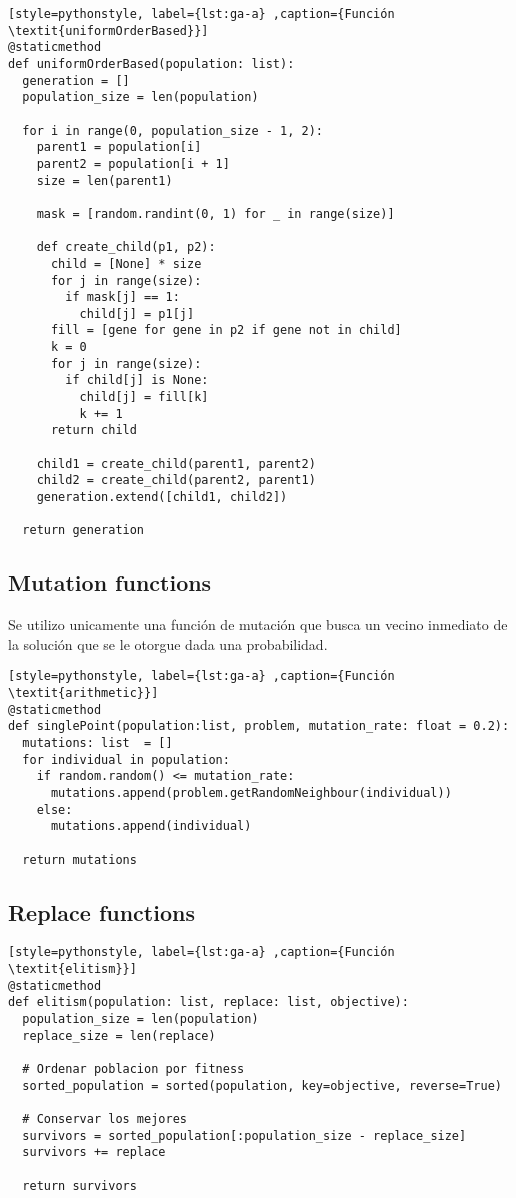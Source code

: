 \begin{lstlisting}[style=pythonstyle, label={lst:ga-a} ,caption={Función  \textit{uniformOrderBased}}]
@staticmethod
def uniformOrderBased(population: list):
  generation = []
  population_size = len(population)

  for i in range(0, population_size - 1, 2):
    parent1 = population[i]
    parent2 = population[i + 1]
    size = len(parent1)

    mask = [random.randint(0, 1) for _ in range(size)]

    def create_child(p1, p2):
	  child = [None] * size
	  for j in range(size):
	    if mask[j] == 1:
		  child[j] = p1[j]
	  fill = [gene for gene in p2 if gene not in child]
	  k = 0
	  for j in range(size):
		if child[j] is None:
		  child[j] = fill[k]
	  	  k += 1
	  return child

	child1 = create_child(parent1, parent2)
	child2 = create_child(parent2, parent1)
	generation.extend([child1, child2])

  return generation
\end{lstlisting}

\subsection{Mutation functions}

Se utilizo unicamente una función de mutación que busca un vecino inmediato de la solución que se le otorgue dada una probabilidad.

\begin{lstlisting}[style=pythonstyle, label={lst:ga-a} ,caption={Función  \textit{arithmetic}}]
@staticmethod
def singlePoint(population:list, problem, mutation_rate: float = 0.2):
  mutations: list  = []
  for individual in population:
    if random.random() <= mutation_rate:
      mutations.append(problem.getRandomNeighbour(individual))
    else:
      mutations.append(individual)

  return mutations
\end{lstlisting}

\subsection{Replace functions}

\begin{lstlisting}[style=pythonstyle, label={lst:ga-a} ,caption={Función  \textit{elitism}}]
@staticmethod
def elitism(population: list, replace: list, objective):
  population_size = len(population)
  replace_size = len(replace)

  # Ordenar poblacion por fitness
  sorted_population = sorted(population, key=objective, reverse=True)

  # Conservar los mejores
  survivors = sorted_population[:population_size - replace_size]
  survivors += replace

  return survivors
\end{lstlisting}


